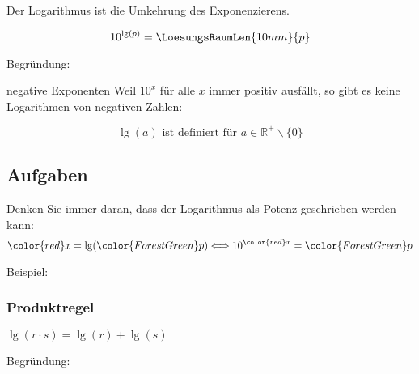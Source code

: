Der Logarithmus ist die Umkehrung des Exponenzierens.

\begin{gesetz}{}{}
  $$10^{\lg(p)} = \LoesungsRaumLen{10mm}{p}$$
\end{gesetz}

Begründung:

\begin{bemerkung}{negative Exponenten}{}
  Weil $10^x$ für alle $x$ immer positiv ausfällt, so gibt es keine
  Logarithmen von negativen Zahlen:

  $$\lg(a) \text{ ist definiert für } a\in\mathbb{R}^+\backslash\{0\}$$
  \end{bemerkung}
\newpage



\subsection*{Aufgaben}
Denken Sie immer daran, dass der Logarithmus als Potenz geschrieben
werden kann:
$${\color{red}x}=\lg({\color{ForestGreen}p}) \Longleftrightarrow  10^{\color{red}x}={\color{ForestGreen}p}$$

Beispiel:






\newpage
\subsubsection{Produktregel}
\begin{gesetz}{}{}
  $\lg(r\cdot s) = \lg(r) + \lg(s)$
\end{gesetz}

Begründung:

